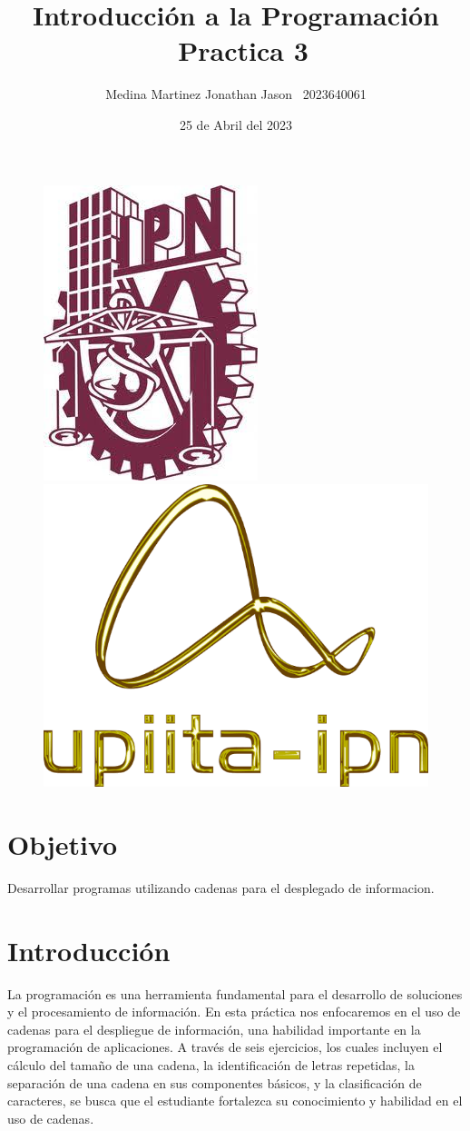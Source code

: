 \documentclass{article}
\title{Introducción a la Programación \ Practica 3}
\author{Medina Martinez Jonathan Jason \ 2023640061}
\date{25 de Abril del 2023}
\begin{document}
	
	\fontsize{12}{16}\selectfont
	
	\begin{figure}[t] %
		
		\includegraphics[width=2.5 cm]{Logo1.jpeg}
		\hfill
		\includegraphics[width=3 cm]{Logo2.png}
		
	\end{figure}
	
	\maketitle %
	\newpage
	
	\tableofcontents %
	\newpage
	
	\section{Objetivo}
	
	Desarrollar programas utilizando cadenas para el desplegado de informacion.
	
	\section{Introducción}
	
	La programación es una herramienta fundamental para el desarrollo de soluciones y el procesamiento de información. En esta práctica nos enfocaremos en el uso de cadenas para el despliegue de información, una habilidad importante en la programación de aplicaciones. A través de seis ejercicios, los cuales incluyen el cálculo del tamaño de una cadena, la identificación de letras repetidas, la separación de una cadena en sus componentes básicos, y la clasificación de caracteres, se busca que el estudiante fortalezca su conocimiento y habilidad en el uso de cadenas.
	
\end{document}
